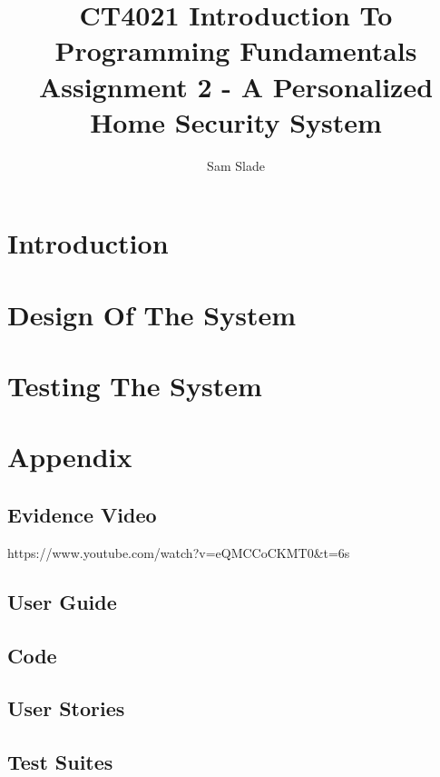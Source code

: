 \documentclass{article}
\title{CT4021 Introduction To Programming Fundamentals\\\large Assignment 2 - A Personalized Home Security System}
\author{Sam Slade}
\date{}
\begin{document}
\maketitle

\section*{Introduction}
  

\section*{Design Of The System}
  

\section*{Testing The System}
  
  
\newpage
\section*{Appendix}
  \subsection{Evidence Video}
    https://www.youtube.com/watch?v=eQMCCoCKMT0&t=6s
  \subsection{User Guide}
    

  \subsection{Code} \label{code}
    

  \subsection{User Stories} \label{user stories}
    

  \subsection{Test Suites} \label{test suites}
    

\newpage
\end{document}
